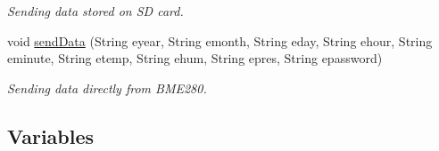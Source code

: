 \begin{DoxyCompactItemize}
\begin{DoxyCompactList}\small\item\em Sending data stored on SD card. \end{DoxyCompactList}\item 
void \hyperlink{_w_s_8ino_aa9f1e5f04588dc7c432816e2faac1c2a}{send\+Data} (String eyear, String emonth, String eday, String ehour, String eminute, String etemp, String ehum, String epres, String epassword)
\begin{DoxyCompactList}\small\item\em Sending data directly from B\+M\+E280. \end{DoxyCompactList}\end{DoxyCompactItemize}
\subsection*{Variables}
